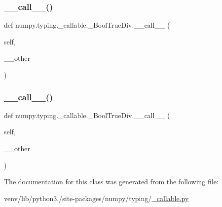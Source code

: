 \subsubsection{\texorpdfstring{\+\_\+\+\_\+call\+\_\+\+\_\+()}{\_\_call\_\_()}\hspace{0.1cm}{\footnotesize\ttfamily [2/3]}}
{\footnotesize\ttfamily def numpy.\+typing.\+\_\+callable.\+\_\+\+Bool\+True\+Div.\+\_\+\+\_\+call\+\_\+\+\_\+ (\begin{DoxyParamCaption}\item[{}]{self,  }\item[{}]{\+\_\+\+\_\+other }\end{DoxyParamCaption})}

\mbox{\label{classnumpy_1_1typing_1_1__callable_1_1__BoolTrueDiv_ae0a97ec71e4d0a090df1d56cd09def37}} 
\subsubsection{\texorpdfstring{\+\_\+\+\_\+call\+\_\+\+\_\+()}{\_\_call\_\_()}\hspace{0.1cm}{\footnotesize\ttfamily [3/3]}}
{\footnotesize\ttfamily def numpy.\+typing.\+\_\+callable.\+\_\+\+Bool\+True\+Div.\+\_\+\+\_\+call\+\_\+\+\_\+ (\begin{DoxyParamCaption}\item[{}]{self,  }\item[{}]{\+\_\+\+\_\+other }\end{DoxyParamCaption})}



The documentation for this class was generated from the following file\+:\begin{DoxyCompactItemize}
\item 
venv/lib/python3./site-\/packages/numpy/typing/\hyperlink{__callable_8py}{\+\_\+callable.\+py}\end{DoxyCompactItemize}
